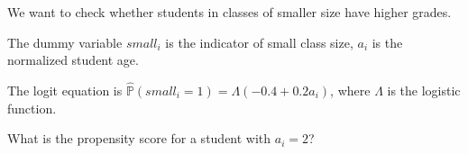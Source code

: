
\begin{question}
We want to check whether students in classes of smaller size have higher grades.

The dummy variable \(small_i\) is the indicator of small class size, \(a_i\) is the normalized student age.

The logit equation is \(\hat{\mathbb{P}}(small_i = 1) = \Lambda(-0.4 + 0.2 a_i)\), where \(\Lambda\) is the logistic function.

What is the propensity score for a student with \(a_i = 2\)?
\end{question}


